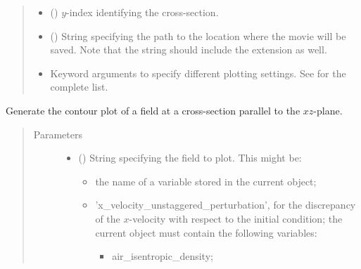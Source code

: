 \documentclass[letterpaper,10pt,english]{sphinxmanual}
\begin{document}
\begin{fulllineitems}
\begin{fulllineitems}
\begin{quote}
\begin{description}
\begin{itemize}
\begin{itemize}
\end{itemize}


\item {} 
 () \textendash{} \(y\)-index identifying the cross-section.

\item {} 
 () \textendash{} String specifying the path to the location where the movie will be saved.
Note that the string should include the extension as well.

\item {} 
 \textendash{} Keyword arguments to specify different plotting settings.
See {\hyperref[\detokenize{api:tasmania.utils.utils_plot.animation_contourf_xz}]{}} for the complete list.

\end{itemize}

\end{description}\end{quote}

\end{fulllineitems}


\begin{fulllineitems}
\label{\detokenize{api:tasmania.storages.state_isentropic.StateIsentropic.contour_xz}}
Generate the contour plot of a field at a cross-section parallel to the \(xz\)-plane.
\begin{quote}\begin{description}
\item[{Parameters}] \leavevmode\begin{itemize}
\item {} 
 () \textendash{} 
String specifying the field to plot. This might be:
\begin{itemize}
\item {} 
the name of a variable stored in the current object;

\item {} 
’x\_velocity\_unstaggered\_perturbation’, for the discrepancy of the \(x\)-velocity with respect to                          the initial condition; the current object must contain the following variables:
\begin{itemize}
\item {} 
air\_isentropic\_density;


\end{itemize}
\end{itemize}
\end{itemize}
\end{description}
\end{quote}
\end{fulllineitems}
\end{fulllineitems}
\end{document}

